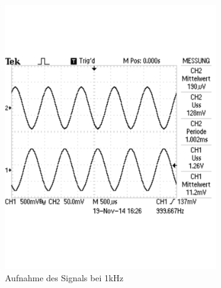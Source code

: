 \documentclass[12pt,a4paper]{article}
\begin{document}
\begin{figure}[H]
        \centering
        \begin{subfigure}[b]{0.28\textwidth}
                \includegraphics[width=\textwidth , scale = 0.4]{2_4_10_1k.pdf}
                \caption[Aufnahme des Signals bei 1kHz]{Aufnahme des Signals bei 1kHz}
                \label{fig:2_4_10_1k}
        \end{subfigure}%
        \hfill
        \begin{subfigure}[b]{0.28\textwidth}

\end{subfigure}
\end{figure}
\end{document}
